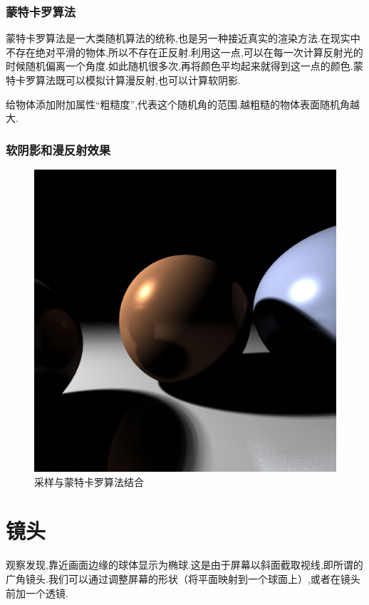 \documentclass[10pt,twocolumn]{article}
\begin{document}
\subsubsection{\hei 蒙特卡罗算法}
蒙特卡罗算法是一大类随机算法的统称,也是另一种接近真实的渲染方法.在现实中不存在绝对平滑的物体,所以不存在正反射.利用这一点,可以在每一次计算反射光的时候随机偏离一个角度.如此随机很多次,再将颜色平均起来就得到这一点的颜色.蒙特卡罗算法既可以模拟计算漫反射,也可以计算软阴影.

给物体添加附加属性“粗糙度”,代表这个随机角的范围.越粗糙的物体表面随机角越大.

\subsubsection{\hei 软阴影和漫反射效果}
\begin{figure}[ht]
\centering
\includegraphics[scale=.18]{fig6.jpg}
\caption{采样与蒙特卡罗算法结合}
\end{figure}

\section{\hei 镜头}
观察发现,靠近画面边缘的球体显示为椭球.这是由于屏幕以斜面截取视线,即所谓的广角镜头.我们可以通过调整屏幕的形状（将平面映射到一个球面上）,或者在镜头前加一个透镜.
\end{document}
